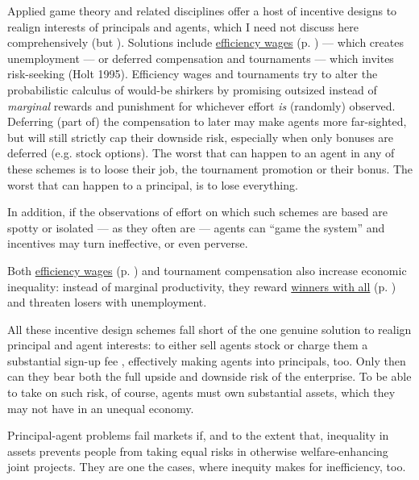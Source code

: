 Applied game theory and related disciplines offer a host of incentive designs to realign interests of principals and agents, which I need not discuss here comprehensively (but \citealt{Tirole2006}). Solutions include \hyperref[sec:efficiency_wages]{efficiency wages} (p. \pageref{sec:efficiency_wages}) --- which creates unemployment --- or deferred compensation and tournaments --- which invites risk-seeking (Holt 1995). Efficiency wages and tournaments try to alter the probabilistic calculus of would-be shirkers by promising outsized instead of \emph{marginal} rewards and punishment for whichever effort \emph{is} (randomly) observed. Deferring (part of) the compensation to later may make agents more far-sighted, but will still strictly cap their downside risk, especially when only bonuses are deferred (e.g. stock options). The worst that can happen to an agent in any of these schemes is to loose their job, the tournament promotion or their bonus. The worst that can happen to a principal, is to lose everything.

In addition, if the observations of effort on which such schemes are based are spotty or isolated --- as they often are --- agents can ``game the system'' and incentives may turn ineffective, or even perverse. 

Both \hyperref[sec:efficiency_wages]{efficiency wages} (p. \pageref{sec:efficiency_wages}) and tournament compensation also increase economic inequality: instead of marginal productivity, they reward \hyperref[sec:winner-take-all]{winners with all} (p. \pageref{sec:winner-take-all}) and threaten losers with unemployment.

All these incentive design schemes fall short of the one genuine solution to realign principal and agent interests: to either sell agents stock or charge them a substantial sign-up fee \citep{Tirole2006}, effectively making agents into principals, too. Only then can they bear both the full upside and downside risk of the enterprise. To be able to take on such risk, of course, agents must own substantial assets, which they may not have in an unequal economy.

Principal-agent problems fail markets if, and to the extent that, inequality in assets prevents people from taking equal risks in otherwise welfare-enhancing joint projects. They are one the cases, where inequity makes for inefficiency, too. %

